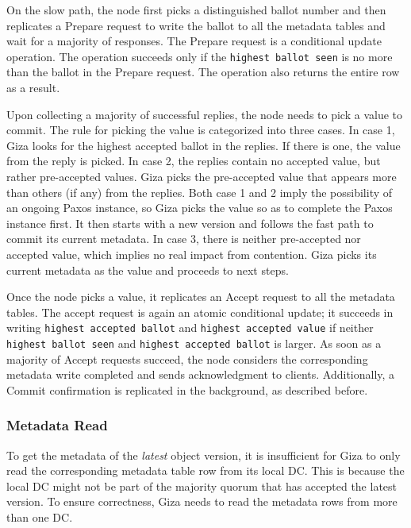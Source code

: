 On the slow path, the {\name} node first picks a distinguished ballot number and
then replicates a Prepare request to write the ballot to all the metadata tables
and wait for a majority of responses. The Prepare request is a conditional
update operation. The operation succeeds only if the {\tt highest ballot seen}
is no more than the ballot in the Prepare request. The operation also returns
the entire row as a result.

Upon collecting a majority of successful replies, the {\name} node needs to pick
a value to commit. The rule for picking the value is categorized into three
cases. In case 1, Giza looks for the highest accepted ballot in the replies. If
there is one, the value from the reply is picked. In case 2, the replies contain
no accepted value, but rather pre-accepted values. Giza picks the pre-accepted
value that appears more than others (if any) from the replies. Both case 1 and 2
imply the possibility of an ongoing Paxos instance, so Giza picks the value so
as to complete the Paxos instance first. It then starts with a new version and
follows the fast path to commit its current metadata. In case 3, there is
neither pre-accepted nor accepted value, which implies no real impact from
contention. Giza picks its current metadata as the value and proceeds to next
steps.

Once the {\name} node picks a value, it replicates an Accept request to all the
metadata tables. The accept request is again an atomic conditional update; it
succeeds in writing {\tt highest accepted ballot} and {\tt highest accepted
  value} if neither {\tt highest ballot seen} and {\tt highest accepted ballot}
is larger. As soon as a majority of Accept requests succeed, the \name node
considers the corresponding metadata write completed and sends acknowledgment to
clients. Additionally, a Commit confirmation is replicated in the background, as
described before.

\subsubsection{Metadata Read}

To get the metadata of the \emph{latest} object version, it is insufficient for
Giza to only read the corresponding metadata table row from its local DC. This
is because the local DC might not be part of the majority quorum that has
accepted the latest version. To ensure correctness, Giza needs to read the
metadata rows from more than one DC.

